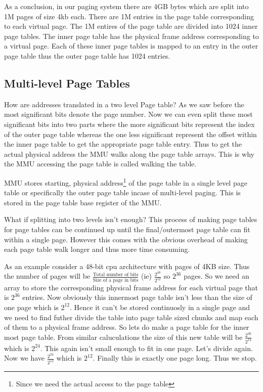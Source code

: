 \documentclass[12pt]{article}
\newcommand{\tbox}[1]{\noindent\fbox{\parbox{\textwidth}{#1}}}
\begin{document}
As a conclusion, in our paging system there are 4GB bytes which are split into 1M pages of size 4kb each. There are 1M entries in the page table corresponding to each virtual page. The 1M entires of the page table are divided into 1024 inner page tables.
The inner page table has the physical frame address corresponding to a virtual page. Each of these inner page tables is mapped to an entry in the outer page table thus the outer page table has 1024 entries.



\subsection{Multi-level Page Tables}
How are addresses translated in a two level Page table? As we saw before the most significant bits denote the page number. Now we can even split these most
significant bits into two parts where the more significant bits represent the index of the outer page table whereas the one less significant represent the offset within the inner page table to get the appropriate page table entry. Thus to get the actual 
physical address the MMU walks along the page table arrays. This is why the MMU accessing the page table is called walking the table. 


MMU stores starting, physical address\footnote{Since we need the actual access to the page table} of the page table in a single level page table or specifically the outer page table incase of multi-level paging. 
This is stored in the page table base register of the MMU.

What if splitting into two levels isn't enough? This process of making page tables for page tables can be continued up until the final/outermost page table can fit within a single page. 
However this comes with the obvious overhead of making each page table walk longer and thus more time consuming. 

\newpage
\noindent\tbox{
    \begin{center}
    \textbf{\Huge Lecture 15}\\
    \end{center}
}
\vspace*{0.1cm}


As an example consider a 48-bit cpu architecture with pages of 4KB size. Thus the number of pages will be \(\frac{\text{Total number of bits}}{\text{Size of a page in bits}}\) (ie) \(\frac{2^{48}}{2^{12}}\) so \(2^{36}\) pages. So we need an array to store the corresponding 
physical frame address for each virtual page that is \(2^{36}\) entries. Now obviously this innermost page table isn't less than the size of one page which is \(2^{12}\). Hence it can't be stored continuosly in a single page and we need to find futher divide the table into page table sized chunks and map each of them to a physical frame address.
So lets do make a page table for the inner most page table. From similar caluculations the size of this new table will be \(\frac{2^{36}}{2^{12}}\) which is \(2^{24}\). This again isn't small enough to fit in one page. Let's divide again. Now we have \(\frac{2^{24}}{2^{12}}\) which is \(2^{12}\). Finally this is exactly one page long.
Thus we stop.
\end{document}
